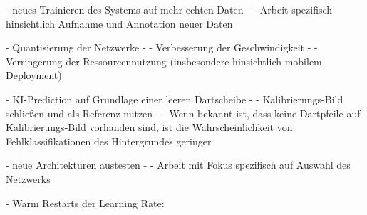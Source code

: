- neues Trainieren des Systems auf mehr echten Daten
- - Arbeit spezifisch hinsichtlich Aufnahme und Annotation neuer Daten

- Quantisierung der Netzwerke
- - Verbesserung der Geschwindigkeit
- - Verringerung der Ressourcennutzung (insbesondere hinsichtlich mobilem Deployment)

- KI-Prediction auf Grundlage einer leeren Dartscheibe
- - Kalibrierungs-Bild schließen und als Referenz nutzen
- - Wenn bekannt ist, dass keine Dartpfeile auf Kalibrierungs-Bild vorhanden sind, ist die Wahrscheinlichkeit von Fehlklassifikationen des Hintergrundes geringer

- neue Architekturen austesten
- - Arbeit mit Fokus spezifisch auf Auswahl des Netzwerks

- Warm Restarts der Learning Rate: \cite{lr_warm_restart}
